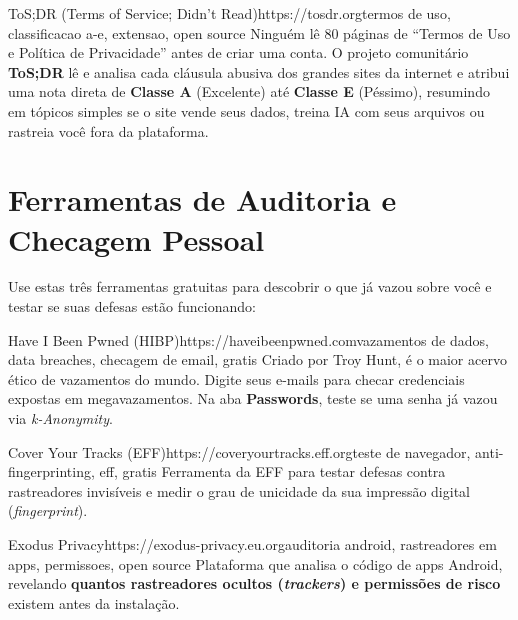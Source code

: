 \documentclass{pousadaguide}
\begin{document}
\begin{ferramenta}[recomendado,logo=tosdr]{ToS;DR (Terms of Service; Didn't Read)}{https://tosdr.org}{termos de uso, classificacao a-e, extensao, open source}
Ninguém lê 80 páginas de ``Termos de Uso e Política de Privacidade'' antes de criar uma conta. O projeto comunitário \textbf{ToS;DR} lê e analisa cada cláusula abusiva dos grandes sites da internet e atribui uma nota direta de \textbf{Classe A} (Excelente) até \textbf{Classe E} (Péssimo), resumindo em tópicos simples se o site vende seus dados, treina IA com seus arquivos ou rastreia você fora da plataforma. 
\end{ferramenta}

\clearpage
\section{Ferramentas de Auditoria e Checagem Pessoal}

Use estas três ferramentas gratuitas para descobrir o que já vazou sobre você e testar se suas defesas estão funcionando:

\begin{ferramenta}[goat,logo=hibp]{Have I Been Pwned (HIBP)}{https://haveibeenpwned.com}{vazamentos de dados, data breaches, checagem de email, gratis}
Criado por Troy Hunt, é o maior acervo ético de vazamentos do mundo. Digite seus e-mails para checar credenciais expostas em megavazamentos. Na aba \textbf{Passwords}, teste se uma senha já vazou via \emph{k-Anonymity}. 
\end{ferramenta}

\begin{ferramenta}[recomendado,logo=coveryourtracks]{Cover Your Tracks (EFF)}{https://coveryourtracks.eff.org}{teste de navegador, anti-fingerprinting, eff, gratis}
Ferramenta da EFF para testar defesas contra rastreadores invisíveis e medir o grau de unicidade da sua impressão digital (\emph{fingerprint}). 
\end{ferramenta}

\begin{ferramenta}[recomendado,logo=exodus]{Exodus Privacy}{https://exodus-privacy.eu.org}{auditoria android, rastreadores em apps, permissoes, open source}
Plataforma que analisa o código de apps Android, revelando \textbf{quantos rastreadores ocultos (\emph{trackers}) e permissões de risco} existem antes da instalação. 
\end{ferramenta}
\end{document}
